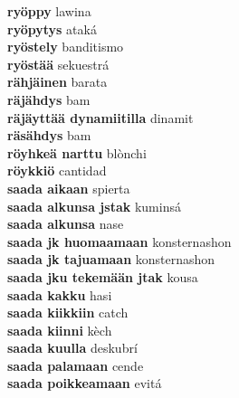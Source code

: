 \textbf{ ryöppy  } lawina \\
\textbf{ ryöpytys  } ataká \\
\textbf{ ryöstely  } banditismo \\
\textbf{ ryöstää  } sekuestrá \\
\textbf{ rähjäinen  } barata \\
\textbf{ räjähdys  } bam \\
\textbf{ räjäyttää dynamiitilla  } dinamit \\
\textbf{ räsähdys  } bam \\
\textbf{ röyhkeä narttu  } blònchi \\
\textbf{ röykkiö  } cantidad \\
\textbf{ saada aikaan  } spierta \\
\textbf{ saada alkunsa jstak  } kuminsá \\
\textbf{ saada alkunsa  } nase \\
\textbf{ saada jk huomaamaan  } konsternashon \\
\textbf{ saada jk tajuamaan  } konsternashon \\
\textbf{ saada jku tekemään jtak  } kousa \\
\textbf{ saada kakku  } hasi \\
\textbf{ saada kiikkiin  } catch \\
\textbf{ saada kiinni  } kèch \\
\textbf{ saada kuulla  } deskubrí \\
\textbf{ saada palamaan  } cende \\
\textbf{ saada poikkeamaan  } evitá \\
